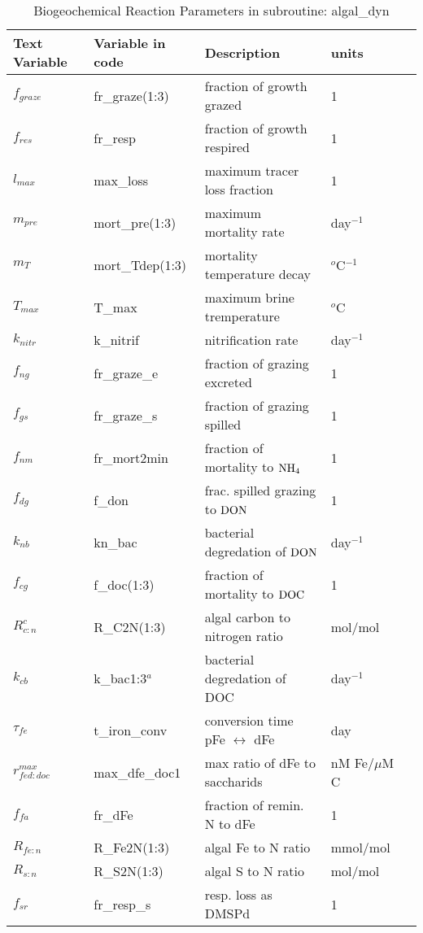 \begin{table}[t!]
  \caption{Biogeochemical Reaction Parameters in subroutine: algal\_dyn}
\begin{threeparttable}
\begin{tabular}{l|l|l|l|l} \hline %
Text Variable & Variable in code & Description &  units \\ \hline
$f_{graze}$ & fr\_graze(1:3) & fraction of growth grazed &  1  \\
$f_{res}$ & fr\_resp& fraction of growth respired & 1 \\
$l_{max}$ & max\_loss & maximum tracer loss fraction & 1  \\
$m_{pre}$ & mort\_pre(1:3) & maximum mortality rate   & day$^{-1}$ \\
$m_{T}$ & mort\_Tdep(1:3) & mortality temperature decay & $^o$C$^{-1}$  \\
$T_{max}$ & T\_max& maximum brine tremperature & $^o$C \\
$k_{nitr}$ & k\_nitrif & nitrification rate  & day$^{-1}$  \\
$f_{ng}$ & fr\_graze\_e & fraction of grazing excreted  & 1 \\
$f_{gs}$ & fr\_graze\_s & fraction of grazing spilled & 1  \\
$f_{nm}$ & fr\_mort2min & fraction of mortality to $\mbox{NH$_4$}$  &1 \\
$f_{dg}$ & f\_don & frac. spilled grazing to $\mbox{DON}$  & 1 \\
$k_{nb}$ & kn\_bac & bacterial degredation of $\mbox{DON}$ &
day$^{-1}$  \\
$f_{cg}$ & f\_doc(1:3) & fraction of mortality to $\mbox{DOC}$ &
1 \\
$R_{c:n}^c$& R\_C2N(1:3) & algal carbon to nitrogen ratio & mol/mol  \\
$k_{cb}$ & k\_bac{1:3}$^a$ & bacterial degredation of DOC & day$^{-1}$  \\
$\tau_{fe}$ & t\_iron\_conv & conversion time pFe $\leftrightarrow$ dFe
 & day \\
$r^{max}_{fed:doc}$ & max\_dfe\_doc1 & max ratio of dFe to saccharids
 & nM Fe$/\mu$M C \\
$f_{fa}$ & fr\_dFe & fraction of remin. N to dFe  & 1 \\
$R_{fe:n}$ & R\_Fe2N(1:3) & algal Fe to N ratio &
mmol/mol \\
$R_{s:n}$ & R\_S2N(1:3) & algal S to N ratio &
mol/mol  \\
$f_{sr}$ & fr\_resp\_s & resp. loss as DMSPd & 1  \\

\end{tabular}
\end{threeparttable}
\end{table}
